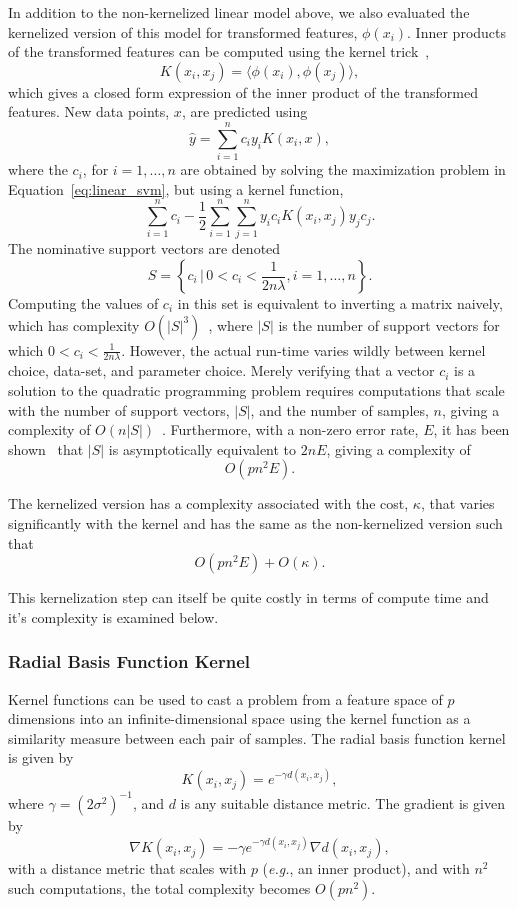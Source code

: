 \documentclass[fonts]{icst}
\begin{document}
In addition to the non-kernelized linear model above, we also evaluated the kernelized version of this model for transformed features, $\phi(x_i)$.
Inner products of the transformed features can be computed using the kernel trick~\cite{cortes1995support},
$$
    K(x_i, x_j) = \langle\phi(x_i), \phi(x_j)\rangle,
$$
which gives a closed form expression of the inner product of the transformed features.
New data points, $x$, are predicted using
$$
    \hat{y} = \sum_{i = 1}^n c_i y_i K(x_i, x),
$$
where the $c_i$, for $i=1,\ldots,n$ are obtained by solving the maximization problem in Equation~\ref{eq:linear_svm}, but using a kernel function,
$$
    \sum_{i = 1}^n c_i - \frac{1}{2} \sum_{i=1}^n \sum_{j = 1}^n y_i c_i K(x_i, x_j) y_j c_j.
$$
The nominative support vectors are denoted
$$
    S = \left\{c_i \,\big|\, 0 < c_i < \frac{1}{2n\lambda}, i=1,\ldots,n\right\}.
$$
Computing the values of $c_i$ in this set is equivalent to inverting a matrix naively, which has complexity $O(|S|^3)$~\cite{bordes2005fast}, where $|S|$ is the number of support vectors for which $0 < c_i < \frac{1}{2n\lambda}$.
However, the actual run-time varies wildly between kernel choice, data-set, and parameter choice.
Merely verifying that a vector $c_i$ is a solution to the quadratic programming problem requires computations that scale with the number of support vectors, $|S|$, and the number of samples, $n$, giving a complexity of $O(n|S|)$~\cite{mehmood2015svm}.
Furthermore, with a non-zero error rate, $E$, it has been shown~\cite{christmann2004robustness} that $|S|$ is asymptotically equivalent to $2nE$, giving a  complexity of
$$
    O(pn^2E).
$$

The kernelized version has a complexity associated with the cost, $\kappa$, that varies significantly with the kernel and has the same  as the non-kernelized version such that
$$
    O(pn^2 E) + O(\kappa).
$$

This kernelization step can itself be quite costly in terms of compute time and it's complexity is examined below.

\subsubsection{Radial Basis Function Kernel}

Kernel functions can be used to cast a problem from a feature space of $p$ dimensions into an infinite-dimensional space using the kernel function as a similarity measure between each pair of samples.
The radial basis function kernel is given by
$$
    K(x_i, x_j) = e^{-\gamma d(x_i, x_j)},
$$
where $\gamma = (2 \sigma^2)^{-1}$, and $d$ is any suitable distance metric.
The gradient is given by
$$
    \nabla K(x_i, x_j) = - \gamma e^{-\gamma d( x_i, x_j )} \nabla d(x_i, x_j),
$$
with a distance metric that scales with $p$ (\textit{e.g.}, an inner product), and with $n^2$ such computations, the total complexity becomes $O(pn^2)$.
\end{document}
